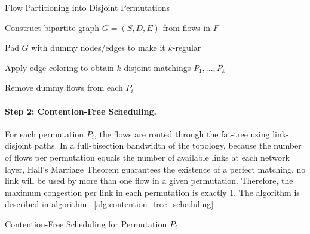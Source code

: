 \begin{algorithm}[H]
\DontPrintSemicolon
\caption{Flow Partitioning into Disjoint Permutations}
\label{alg:partition_permutations}


Construct bipartite graph $G = (S, D, E)$ from flows in $F$\;

Pad $G$ with dummy nodes/edges to make it $k$-regular\;

Apply edge-coloring to obtain $k$ disjoint matchings $P_1, ..., P_k$\;

Remove dummy flows from each $P_i$\;

\end{algorithm}

\paragraph{Step 2: Contention-Free Scheduling.}  
For each permutation \( P_i \), the flows are routed through the fat-tree using link-disjoint paths. In a full-bisection bandwidth of the topology, because the number of flows per permutation equals the number of available links at each network layer, Hall’s Marriage Theorem guarantees the existence of a perfect matching, no link will be used by more than one flow in a given permutation. Therefore, the maximum congestion per link in each permutation is exactly 1. The algorithm is described in algorithm ~\ref{alg:contention_free_scheduling}


\begin{algorithm}[H]
\DontPrintSemicolon
\caption{Contention-Free Scheduling for Permutation $P_i$}
\label{alg:contention_free_scheduling}



\end{algorithm}


